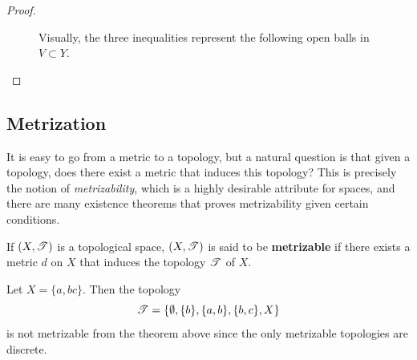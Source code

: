 \begin{proof}
    \begin{figure}[H]
      \centering 
      \caption{Visually, the three inequalities represent the following open balls in $V \subset Y$.} 
      \label{fig:uniform_limit}
    \end{figure}
  \end{proof}


\subsection{Metrization}

  It is easy to go from a metric to a topology, but a natural question is that given a topology, does there exist a metric that induces this topology? This is precisely the notion of \textit{metrizability}, which is a highly desirable attribute for spaces, and there are many existence theorems that proves metrizability given certain conditions.

  \begin{definition}
		\label{def:metrizable_space}
    If $(X, \operatorname{\mathscr{T}})$ is a topological space, $(X, \operatorname{\mathscr{T}})$ is said to be \textbf{metrizable} if there exists a metric $d$ on $X$ that induces the topology $\operatorname{\mathscr{T}}$ of $X$.
  \end{definition}

  \begin{example}
    \label{ex:non-metrizable-finite-spaces}
    Let $X = \{a, b c\}$. Then the topology 
    \begin{equation}
      \operatorname{\mathscr{T}} = \{\emptyset, \{b\}, \{a, b\}, \{b, c\}, X \}
    \end{equation} 
    is not metrizable from the theorem above since the only metrizable topologies are discrete. 
  \end{example}

